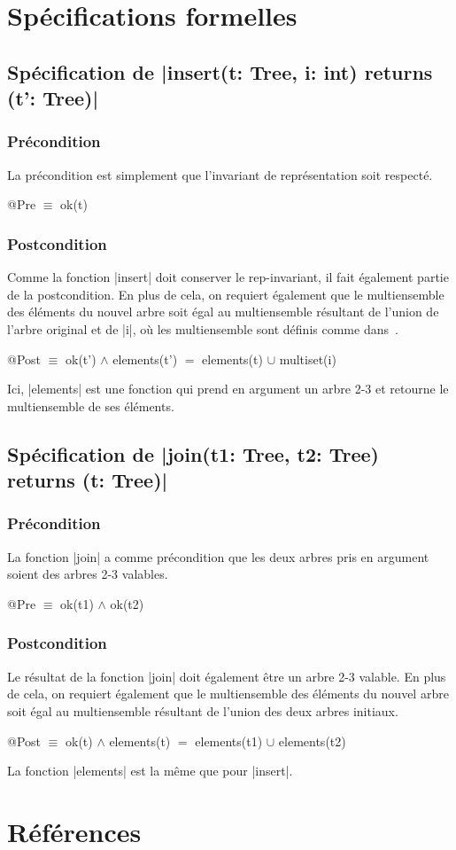 \documentclass{elsarticle}
\begin{document}
\section{Spécifications formelles}
\subsection{Spécification de \inlinedafny|insert(t: Tree, i: int) returns (t': Tree)|}
\subsubsection{Précondition}
La précondition est simplement que l'invariant de représentation soit respecté.
\begin{dafny}
@Pre $\equiv$ ok(t)
\end{dafny}

\subsubsection{Postcondition}
Comme la fonction \inlinedafny|insert| doit conserver le rep-invariant, il fait également partie de la postcondition.
En plus de cela, on requiert également que le multiensemble des éléments du nouvel arbre soit égal au multiensemble résultant de l'union de l'arbre original et de \inlinedafny|i|, où les multiensemble sont définis comme dans~\cite{blizard1991}.
\begin{dafny}
@Post $\equiv$ ok(t') $\land$ elements(t') $=$ elements(t) $\cup$ multiset(i)
\end{dafny}
Ici, \inlinedafny|elements| est une fonction qui prend en argument un arbre 2-3 et retourne le multiensemble de ses éléments.

\subsection{Spécification de \inlinedafny|join(t1: Tree, t2: Tree) returns (t: Tree)|}
\subsubsection{Précondition}
La fonction \inlinedafny|join| a comme précondition que les deux arbres pris en argument soient des arbres 2-3 valables.
\begin{dafny}
@Pre $\equiv$ ok(t1) $\land$ ok(t2)
\end{dafny}

\subsubsection{Postcondition}
Le résultat de la fonction \inlinedafny|join| doit également être un arbre 2-3 valable.
En plus de cela, on requiert également que le multiensemble des éléments du nouvel arbre soit égal au multiensemble résultant de l'union des deux arbres initiaux.
\begin{dafny}
@Post $\equiv$ ok(t) $\land$ elements(t) $=$ elements(t1) $\cup$ elements(t2)
\end{dafny}
La fonction \inlinedafny|elements| est la même que pour \inlinedafny|insert|.

\section*{Références}


\end{document}
